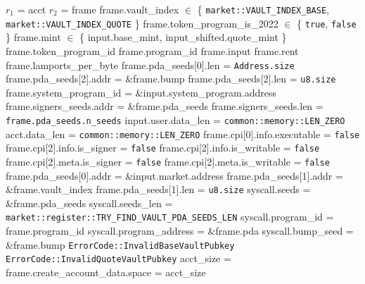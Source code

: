 \begin{algorithm}
\caption{INIT-VAULT}
\begin{algorithmic}
  \INPUT $r_1$ = acct
  \INPUT $r_2$ = frame
  \REQUIRE frame.vault\_index $\in$ \{
    \texttt{market::VAULT\_INDEX\_BASE},
    \texttt{market::VAULT\_INDEX\_QUOTE}
  \}
  \REQUIRE frame.token\_program\_is\_2022 $\in$ \{
    \texttt{true},
    \texttt{false}
  \}
  \REQUIRE frame.mint $\in$ \{
    input.base\_mint,
    input\_shifted.quote\_mint
  \}
  \REQUIRE frame.token\_program\_id
  \REQUIRE frame.program\_id
  \REQUIRE frame.input
  \REQUIRE frame.rent
  \REQUIRE frame.lamports\_per\_byte
  \REQUIRE frame.pda\_seeds[0].len = \texttt{Address.size}
  \REQUIRE frame.pda\_seeds[2].addr = \&frame.bump
  \REQUIRE frame.pda\_seeds[2].len = \texttt{u8.size}
  \REQUIRE frame.system\_program\_id = \&input.system\_program.address
  \REQUIRE frame.signers\_seeds.addr = \&frame.pda\_seeds
  \REQUIRE frame.signers\_seeds.len = \texttt{frame.pda\_seeds.n\_seeds}
  \REQUIRE input.user.data\_len = \texttt{common::memory::LEN\_ZERO}
  \REQUIRE acct.data\_len = \texttt{common::memory::LEN\_ZERO}
  \REQUIRE frame.cpi[0].info.executable = \texttt{false}
  \REQUIRE frame.cpi[2].info.is\_signer = \texttt{false}
  \REQUIRE frame.cpi[2].info.is\_writable = \texttt{false}
  \REQUIRE frame.cpi[2].meta.is\_signer = \texttt{false}
  \REQUIRE frame.cpi[2].meta.is\_writable = \texttt{false}
  \STATE {}
  \STATE {}
  \STATE frame.pda\_seeds[0].addr = \&input.market.address
  \STATE frame.pda\_seeds[1].addr = \&frame.vault\_index
  \STATE frame.pda\_seeds[1].len = \texttt{u8.size}
  \STATE syscall.seeds = \&frame.pda\_seeds
  \STATE syscall.seeds\_len = \texttt{market::register::TRY\_FIND\_VAULT\_PDA\_SEEDS\_LEN}
  \STATE syscall.program\_id = frame.program\_id
  \STATE syscall.program\_address = \&frame.pda
  \STATE syscall.bump\_seed = \&frame.bump
  \STATE {}
      \RETURN \texttt{ErrorCode::InvalidBaseVaultPubkey}
    \ELSE
      \RETURN \texttt{ErrorCode::InvalidQuoteVaultPubkey}
    \ENDIF
  \ENDIF
  \STATE acct\_size = 
  \STATE frame.create\_account\_data.space = acct\_size

\end{algorithmic}
\end{algorithm}
